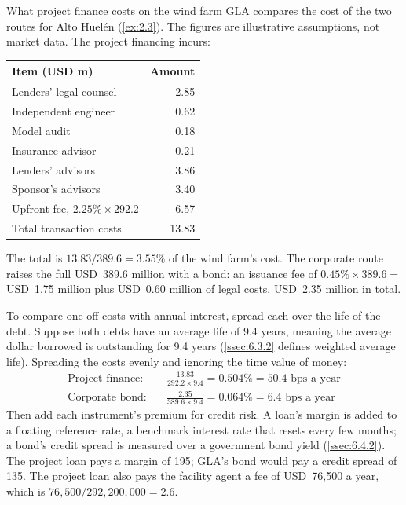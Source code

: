 \begin{example}{What project finance costs on the wind farm \illustrative}\label{ex:2.4}
GLA compares the cost of the two routes for Alto Huelén (\cref{ex:2.3}). The figures are illustrative assumptions, not market data. The project financing incurs:

\begin{center}
\begin{tabularx}{\linewidth}{@{}L r@{}}
\toprule
Item (USD m) & Amount\\
\midrule
Lenders' legal counsel & 2.85\\
Independent engineer & 0.62\\
Model audit & 0.18\\
Insurance advisor & 0.21\\
\midrule
Lenders' advisors & 3.86\\
Sponsor's advisors & 3.40\\
Upfront fee, $2.25\% \times 292.2$ & 6.57\\
\midrule
Total transaction costs & 13.83\\
\bottomrule
\end{tabularx}
\end{center}

The total is $13.83 / 389.6 = 3.55\%$ of the wind farm's cost. The corporate route raises the full USD~389.6 million with a bond: an issuance fee of $0.45\% \times 389.6 = $ USD~1.75 million plus USD~0.60 million of legal costs, USD~2.35 million in total.

To compare one-off costs with annual interest, spread each over the life of the debt. Suppose both debts have an average life of 9.4 years, meaning the average dollar borrowed is outstanding for 9.4 years (\cref{ssec:6.3.2} defines weighted average life). Spreading the costs evenly and ignoring the time value of money:
\begin{align*}
\text{Project finance:}\quad & \frac{13.83}{292.2 \times 9.4} = 0.504\% = 50.4\text{ bps a year}\\
\text{Corporate bond:}\quad & \frac{2.35}{389.6 \times 9.4} = 0.064\% = 6.4\text{ bps a year}
\end{align*}
Then add each instrument's premium for credit risk. A loan's margin is added to a floating reference rate, a benchmark interest rate that resets every few months; a bond's credit spread is measured over a government bond yield (\cref{ssec:6.4.2}). The project loan pays a margin of 195\bps; GLA's bond would pay a credit spread of 135\bps. The project loan also pays the facility agent a fee of USD~76,500 a year, which is $76{,}500 / 292{,}200{,}000 = 2.6$\bps.


\end{example}
